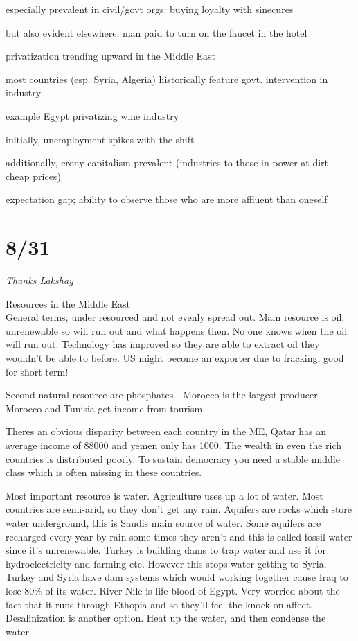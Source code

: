 \documentclass[12pt]{article}
\begin{document}
especially prevalent in civil/govt orgs: buying loyalty with sinecures

but also evident elsewhere; man paid to turn on the faucet in the hotel

\noindent
privatization trending upward in the Middle East

most countries (esp. Syria, Algeria) historically feature govt. intervention in industry

example Egypt privatizing wine industry

initially, unemployment spikes with the shift

additionally, crony capitalism prevalent (industries to those in power at dirt-cheap prices)

expectation gap; ability to observe those who are more affluent than oneself

\newpage
\section{8/31}

\textit{Thanks Lakshay}

\noindent
Resources in the Middle East\\

General terms, under resourced and not evenly spread out. Main resource is oil, unrenewable so will run out and what happens then. No one knows when the oil will run out. Technology has improved so they are able to extract oil they wouldn't be able to before. US might become an exporter due to fracking, good for short term! 

Second natural resource are phosphates - Morocco is the largest producer. Morocco and Tunisia get income from tourism.

Theres an obvious disparity between each country in the ME, Qatar has an average income of 88000 and yemen only has 1000. The wealth in even the rich countries is distributed poorly. To sustain democracy you need a stable middle class which is often missing in these countries. 

Most important resource is water. Agriculture uses up a lot of water. Most countries are semi-arid, so they don't get any rain. Aquifers are rocks which store water underground, this is Saudis main source of water. Some aquifers are recharged every year by rain some times they aren't and this is called fossil water since it's unrenewable. Turkey is building dams to trap water and use it for hydroelectricity and farming etc. However this stops water getting to Syria. Turkey and Syria have dam systems which would working together cause Iraq to lose 80\% of its water. River Nile is life blood of Egypt. Very worried about the fact that it runs through Ethopia and so they'll feel the knock on affect. Desalinization is another option. Heat up the water, and then condense the water.
\end{document}

